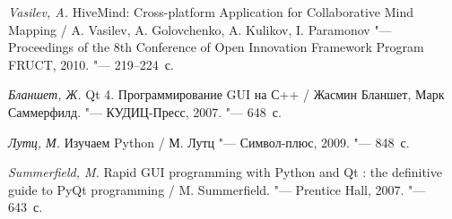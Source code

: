\newpage
{}
\begin{thebibliography}{99}

\textit {Vasilev, A.}
HiveMind: Cross-platform Application for Collaborative Mind Mapping
/ A. Vasilev, A. Golovchenko, A. Kulikov, I. Paramonov
"--- Proceedings of the 8th Conference of Open Innovation Framework Program
FRUCT, 2010.
"---  219--224~с.

\textit {Бланшет, Ж.} Qt 4. Программирование GUI на С++
/ Жасмин Бланшет, Марк Саммерфилд.
"--- КУДИЦ-Пресс, 2007.
"--- 648~с.

\textit {Лутц, М.} Изучаем Python
/ М. Лутц
"--- Символ-плюс, 2009.
"--- 848~с.

\textit {Summerfield, M.} Rapid GUI programming with Python and Qt : the
definitive guide to PyQt programming
/ M. Summerfield.
"--- Prentice Hall, 2007.
"--- 643~с.

\end{thebibliography}